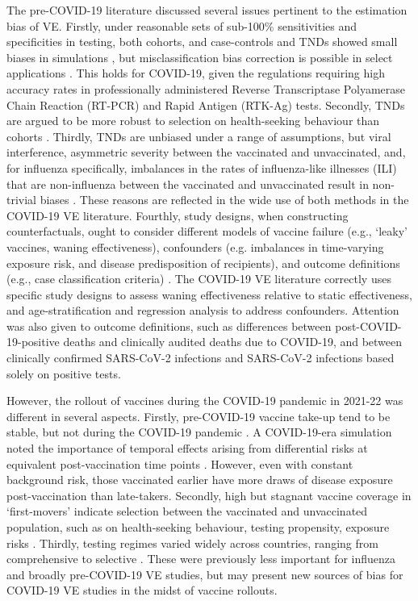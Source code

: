 \documentclass[12pt]{article}
\begin{document}
The pre-COVID-19 literature discussed several issues pertinent to the estimation bias of VE. Firstly, under reasonable sets of sub-100\% sensitivities and specificities in testing, both cohorts, and case-controls and TNDs showed small biases in simulations \citep{orenstein2007methodologic}, but misclassification bias correction is possible in select applications \citep{patel2020postlicensure, endo2020bias}. This holds for COVID-19, given the regulations requiring high accuracy rates in professionally administered Reverse Transcriptase Polyamerase Chain Reaction (RT-PCR) and Rapid Antigen (RTK-Ag) tests. Secondly, TNDs are argued to be more robust to selection on health-seeking behaviour than cohorts \citep{jackson2013test}. Thirdly, TNDs are unbiased under a range of assumptions, but viral interference, asymmetric severity between the vaccinated and unvaccinated, and, for influenza specifically, imbalances in the rates of influenza-like illnesses (ILI) that are non-influenza between the vaccinated and unvaccinated result in non-trivial biases \citep{foppa2013case, jackson2013test, jackson2018impact}. These reasons are reflected in the wide use of both methods in the COVID-19 VE literature. Fourthly, study designs, when constructing counterfactuals, ought to consider different models of vaccine failure (e.g., `leaky' vaccines, waning effectiveness), confounders (e.g. imbalances in time-varying exposure risk, and disease predisposition of recipients), and outcome definitions (e.g., case classification criteria) \citep{crowcroft2018framework}. The COVID-19 VE literature correctly uses specific study designs to assess waning effectiveness relative to static effectiveness, and age-stratification and regression analysis to address confounders. Attention was also given to outcome definitions, such as differences between post-COVID-19-positive deaths and clinically audited deaths due to COVID-19, and between clinically confirmed SARS-CoV-2 infections and SARS-CoV-2 infections based solely on positive tests.

However, the rollout of vaccines during the COVID-19 pandemic in 2021-22 was different in several aspects. Firstly, pre-COVID-19 vaccine take-up tend to be stable, but not during the COVID-19 pandemic \citep{ritchie2020coronavirus}. A COVID-19-era simulation noted the importance of temporal effects arising from differential risks at equivalent post-vaccination time points \citep{lewnard2021theoretical}. However, even with constant background risk, those vaccinated earlier have more draws of disease exposure post-vaccination than late-takers. Secondly, high but stagnant vaccine coverage in `first-movers' indicate selection between the vaccinated and unvaccinated population, such as on health-seeking behaviour, testing propensity, exposure risks \citep{ritchie2020coronavirus}. Thirdly, testing regimes varied widely across countries, ranging from comprehensive to selective \citep{ritchie2020coronavirus}. These were previously less important for influenza and broadly pre-COVID-19 VE studies, but may present new sources of bias for COVID-19 VE studies in the midst of vaccine rollouts.
\end{document}
